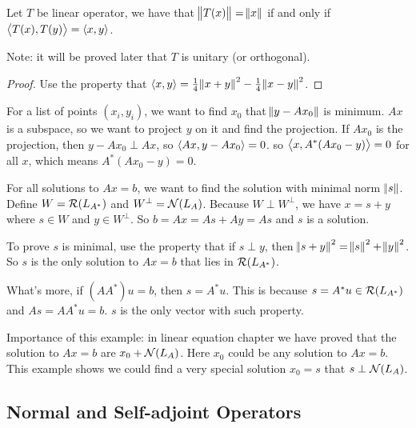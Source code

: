 \begin{theorem}
    Let $T$ be linear operator, we have that $\norm{T(x)} = \norm{x}$ if and only if $\left\langle \displaystyle T(x), T(y) \right\rangle = \left\langle \displaystyle x, y \right\rangle$.
    
    Note: it will be proved later that $T$ is unitary (or orthogonal).
\end{theorem}
\begin{proof}
    Use the property that $\left\langle \displaystyle x, y \right\rangle = \frac{1}{4}\norm{x+y}^2 - \frac{1}{4}\norm{x-y}^2$.
\end{proof}



\begin{example}
    For a list of points $(x_i, y_i)$, we want to find $x_0$ that $\norm{y - Ax_0}$ is minimum. $Ax$ is a subspace, so we want to project $y$ on it and find the projection. If $Ax_0$ is the projection, then $y - Ax_0 \perp Ax$, so $\left\langle \displaystyle Ax, y - Ax_0 \right\rangle = 0$. so $\left\langle \displaystyle x, A^* (Ax_0 - y) \right\rangle = 0$ for all $x$, which means $A^* (Ax_0 - y) = 0$.
\end{example}

\begin{example}
    For all solutions to $Ax=b$, we want to find the solution with minimal norm $\norm{s}$. Define $W = \mathcal{R}(L_{A^*})$ and $W^\perp = \mathcal{N}(L_A)$. Because $W \perp W^\perp$, we have $x = s + y$ where $s \in W$ and $y \in W^\perp$. So $b = Ax = As + Ay = As$ and $s$ is a solution.
    
    To prove $s$ is minimal, use the property that if $s \perp y$, then $\norm{s+y}^2 = \norm{s}^2 + \norm{y}^2$. So $s$ is the only solution to $Ax=b$ that lies in $\mathcal{R}(L_{A^*})$.
    
    What's more, if $(AA^*)u = b$, then $s = A^* u$. This is because $s = A^* u \in \mathcal{R}(L_{A^*})$ and $As = AA^*u = b$. $s$ is the only vector with such property.
    
    Importance of this example: in linear equation chapter we have proved that the solution to $Ax=b$ are $x_0 +  \mathcal{N}(L_A)$. Here $x_0$ could be any solution to $Ax=b$. This example shows we could find a very special solution $x_0 = s$ that $s \perp \mathcal{N}(L_A)$.
\end{example}




\subsection{Normal and Self-adjoint Operators}

